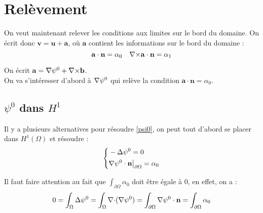 \section{Relèvement}
\label{relev}
On veut maintenant relever les conditions aux limites sur le bord du domaine. On écrit donc $\mathbf{v}=\mathbf{u}+\mathbf{a}$, où $\mathbf{a}$ contient les informations sur le bord du domaine :
\[ \mathbf{a}\cdot\mathbf{n}=\alpha_0\quad {\nabla\times}\mathbf{a}\cdot\mathbf{n}=\alpha_1 \]

On écrit $\mathbf{a}={\nabla}\psi^0 + {\nabla\times}\mathbf{b}$.\\
On va s'intéresser d'abord à ${\nabla}\psi^0$ qui relève la condition $\mathbf{a}\cdot\mathbf{n}=\alpha_0$.\\

\subsection{$\psi^0$ dans $H^1$}
\label{secpsi0hdiv}
Il y a plusieurs alternatives pour résoudre \ref{psi0}, on peut tout d'abord se placer dans $H^1(\Omega)$ et résoudre :
\begin{equation*}
\left\{\begin{aligned}
&-{\Delta}\psi^0 = 0\\
&{\nabla}\psi^0\cdot \mathbf{n}{\big\rvert_{\partial\Omega}}=\alpha_0
\end{aligned}\right.
\end{equation*}

Il faut faire attention au fait que $\int_{\partial\Omega} \alpha_0$ doit être égale à 0, en effet, on a :
\[ 0=\int_\Omega {\Delta} \psi^0 = \int_\Omega {\nabla\cdot}({\nabla}\psi^0) = \int_{\partial\Omega} {\nabla}\psi^0\cdot \mathbf{n} = \int_{\partial\Omega} \alpha_0 \]

